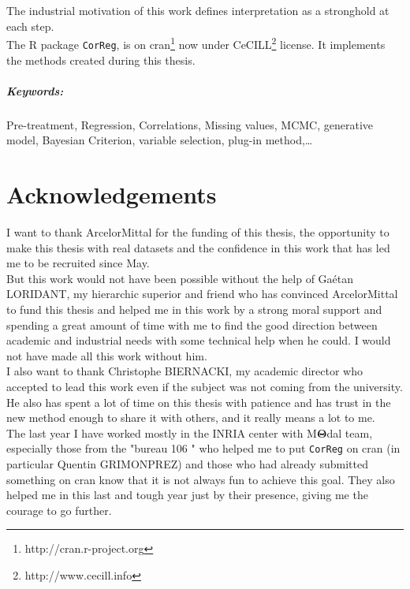 \documentclass[12pt,a4paper]{report}
\begin{document}
	The industrial motivation of this work defines interpretation as a stronghold at each step. 	
	\\
	The R package {\tt CorReg}, is on {\sc cran}\footnote{http://cran.r-project.org} now under CeCILL\footnote{http://www.cecill.info} license. It implements the methods created during this thesis.
	
	 	
\paragraph{Keywords:} Pre-treatment, Regression, Correlations, Missing values, MCMC, generative model, Bayesian Criterion, variable selection, plug-in method,\dots
	

\chapter*{Acknowledgements}
	I want to thank ArcelorMittal for the funding of this thesis, the opportunity to make this thesis with real datasets and the confidence in this work that has led me to be recruited since May.%
	\\
	
	But this work would not have been possible without the help of Gaétan LORIDANT, my hierarchic superior and friend who has convinced ArcelorMittal to fund this thesis and helped me in this work by a strong moral support and spending a great amount of time with me to find the good direction between academic and industrial needs with some technical help when he could. I would not have made all this work without him.\\
	
	I also want to thank Christophe BIERNACKI, my academic director who accepted to lead this work even if the subject was not coming from the university. He also has spent a lot of time on this thesis with patience and has trust in the new method enough to share it with others, and it really means a lot to me. \\
	
	The last year I have worked mostly in the INRIA center with M$\boldsymbol{\Theta}$dal team, especially those from the "bureau 106 " who helped me to put {\tt CorReg} on {\sc cran} (in particular Quentin GRIMONPREZ) and those who had already submitted something on {\sc cran} know that it is not always fun to achieve this goal. They also helped me in this last and tough year just by their presence, giving me the courage to go further. \\
	
\end{document}
